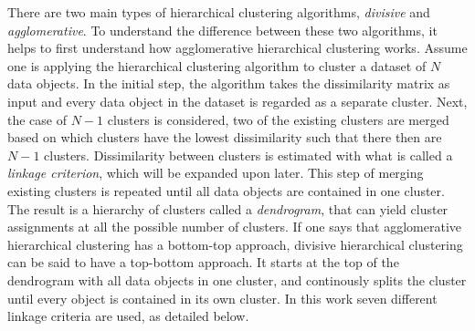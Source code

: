 There are two main types of hierarchical clustering algorithms, \textit{divisive} and \textit{agglomerative}. To understand the difference between these two algorithms, it helps to first understand how agglomerative hierarchical clustering works. Assume one is applying the hierarchical clustering algorithm to cluster a dataset of $N$ data objects. In the initial step, the algorithm takes the dissimilarity matrix as input and every data object in the dataset is regarded as a separate cluster. Next, the case of $N-1$ clusters is considered, two of the existing clusters are merged based on which clusters have the lowest dissimilarity such that there then are $N-1$ clusters. Dissimilarity between clusters is estimated with what is called a \textit{linkage criterion}, which will be expanded upon later. This step of merging existing clusters is repeated until all data objects are contained in one cluster. The result is a hierarchy of clusters called a \textit{dendrogram}, that can yield cluster assignments at all the possible number of clusters. If one says that agglomerative hierarchical clustering has a bottom-top approach, divisive hierarchical clustering can be said to have a top-bottom approach. It starts at the top of the dendrogram with all data objects in one cluster, and continously splits the cluster until every object is contained in its own cluster. In this work seven different linkage criteria are used, as detailed below.

